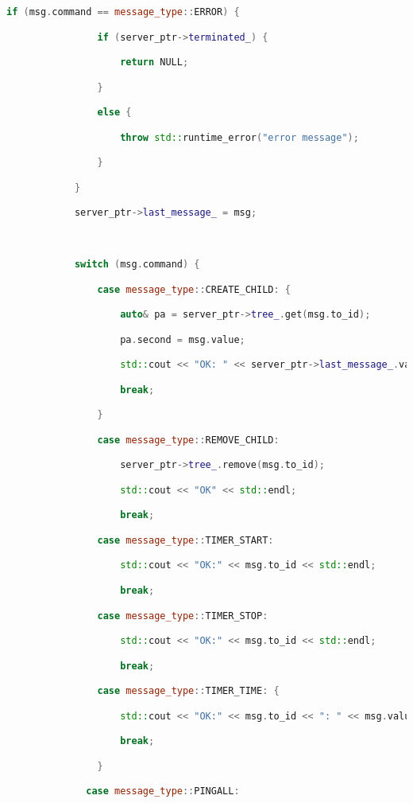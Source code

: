 \begin{lstlisting}[language=C++]
            if (msg.command == message_type::ERROR) {

                if (server_ptr->terminated_) {

                    return NULL;

                } 

                else {

                    throw std::runtime_error("error message");

                }

            }

            server_ptr->last_message_ = msg;



            switch (msg.command) {

                case message_type::CREATE_CHILD: {

                    auto& pa = server_ptr->tree_.get(msg.to_id);

                    pa.second = msg.value;

                    std::cout << "OK: " << server_ptr->last_message_.value << std::endl;

                    break;

                }

                case message_type::REMOVE_CHILD:

                    server_ptr->tree_.remove(msg.to_id);

                    std::cout << "OK" << std::endl;

                    break;

                case message_type::TIMER_START:

                    std::cout << "OK:" << msg.to_id << std::endl;

                    break;

                case message_type::TIMER_STOP:

                    std::cout << "OK:" << msg.to_id << std::endl;

                    break;

                case message_type::TIMER_TIME: {

                    std::cout << "OK:" << msg.to_id << ": " << msg.value << std::endl;

                    break;

                }

              case message_type::PINGALL:


\end{lstlisting}
